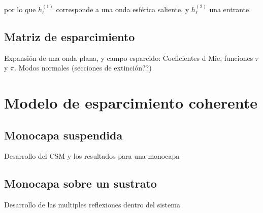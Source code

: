 
\vspace*{-1em}\noindent
por lo que $h_\ell^{(1)}$ corresponde a una onda esférica saliente, y $h_\ell^{(2)}$ una entrante.



	
	\subsection*{Matriz de esparcimiento}
	Expansión de una onda plana, y campo esparcido: Coeficientes d Mie, funciones $\tau$ y $\pi$. Modos normales (secciones de extinción??)

\section{Modelo de esparcimiento coherente}
\blindtext
	 \subsection{Monocapa suspendida}
		Desarrollo del CSM y los resultados para una monocapa	 
	 \subsection{Monocapa sobre un sustrato}
	 	Desarrollo de las multiples reflexiones dentro del sistema
